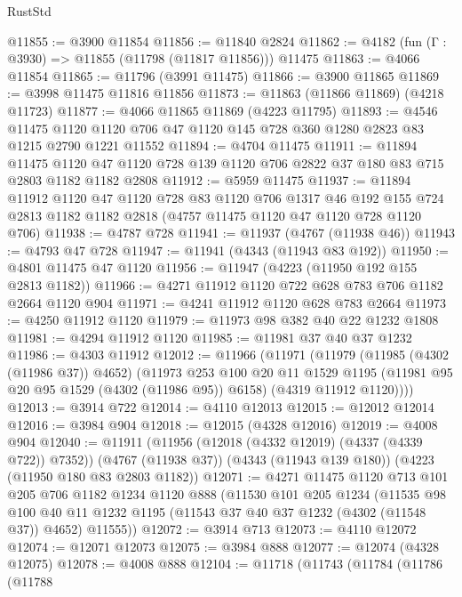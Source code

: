 \begin{lexlean}{RustStd}
\begin{coremodule}
@11855 := @3900 @11854
@11856 := @11840 @2824
@11862 := @4182 (fun (Γ : @3930) => @11855 (@11798 (@11817 @11856))) @11475
@11863 := @4066 @11854
@11865 := @11796 (@3991 @11475)
@11866 := @3900 @11865
@11869 := @3998 @11475 @11816 @11856
@11873 := @11863 (@11866 @11869) (@4218 @11723)
@11877 := @4066 @11865 @11869 (@4223 @11795)
@11893 := @4546
    @11475
    @1120
    @1120
    @706
    @47
    @1120
    @145
    @728
    @360
    @1280
    @2823
    @83
    @1215
    @2790
    @1221
    @11552
@11894 := @4704 @11475
@11911 := @11894
    @11475
    @1120
    @47
    @1120
    @728
    @139
    @1120
    @706
    @2822
    @37
    @180
    @83
    @715
    @2803
    @1182
    @1182
    @2808
@11912 := @5959 @11475
@11937 := @11894
    @11912
    @1120
    @47
    @1120
    @728
    @83
    @1120
    @706
    @1317
    @46
    @192
    @155
    @724
    @2813
    @1182
    @1182
    @2818
    (@4757 @11475 @1120 @47 @1120 @728 @1120 @706)
@11938 := @4787 @728
@11941 := @11937 (@4767 (@11938 @46))
@11943 := @4793 @47 @728
@11947 := @11941 (@4343 (@11943 @83 @192))
@11950 := @4801 @11475 @47 @1120
@11956 := @11947 (@4223 (@11950 @192 @155 @2813 @1182))
@11966 := @4271 @11912 @1120 @722 @628 @783 @706 @1182 @2664 @1120 @904
@11971 := @4241 @11912 @1120 @628 @783 @2664
@11973 := @4250 @11912 @1120
@11979 := @11973 @98 @382 @40 @22 @1232 @1808
@11981 := @4294 @11912 @1120
@11985 := @11981 @37 @40 @37 @1232
@11986 := @4303 @11912
@12012 := @11966
    (@11971
      (@11979
        (@11985 (@4302 (@11986 @37)) @4652)
        (@11973
          @253
          @100
          @20
          @11
          @1529
          @1195
          (@11981 @95 @20 @95 @1529 (@4302 (@11986 @95)) @6158)
          (@4319 @11912 @1120))))
@12013 := @3914 @722
@12014 := @4110 @12013
@12015 := @12012 @12014
@12016 := @3984 @904
@12018 := @12015 (@4328 @12016)
@12019 := @4008 @904
@12040 := @11911
    (@11956 (@12018 (@4332 @12019) (@4337 (@4339 @722)) @7352))
    (@4767 (@11938 @37))
    (@4343 (@11943 @139 @180))
    (@4223 (@11950 @180 @83 @2803 @1182))
@12071 := @4271
    @11475
    @1120
    @713
    @101
    @205
    @706
    @1182
    @1234
    @1120
    @888
    (@11530
      @101
      @205
      @1234
      (@11535
        @98
        @100
        @40
        @11
        @1232
        @1195
        (@11543 @37 @40 @37 @1232 (@4302 (@11548 @37)) @4652)
        @11555))
@12072 := @3914 @713
@12073 := @4110 @12072
@12074 := @12071 @12073
@12075 := @3984 @888
@12077 := @12074 (@4328 @12075)
@12078 := @4008 @888
@12104 := @11718
    (@11743
      (@11784
        (@11786
          (@11788

\end{coremodule}
\end{lexlean}
